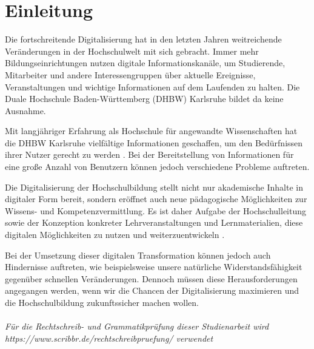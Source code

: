 \chapter{Einleitung}
Die fortschreitende Digitalisierung hat in den letzten Jahren weitreichende Veränderungen in der Hochschulwelt mit sich gebracht. Immer mehr Bildungseinrichtungen nutzen digitale Informationskanäle, um Studierende, Mitarbeiter und andere Interessengruppen über aktuelle Ereignisse, Veranstaltungen und wichtige Informationen auf dem Laufenden zu halten\cite{aachenerzeitung2022}. Die Duale Hochschule Baden-Württemberg (DHBW) Karlsruhe bildet da keine Ausnahme.

Mit langjähriger Erfahrung als Hochschule für angewandte Wissenschaften hat die DHBW Karlsruhe vielfältige Informationen geschaffen, um den Bedürfnissen ihrer Nutzer gerecht zu werden \cite{degruyter2021}. Bei der Bereitstellung von Informationen für eine große Anzahl von Benutzern können jedoch verschiedene Probleme auftreten.

Die Digitalisierung der Hochschulbildung stellt nicht nur akademische Inhalte in digitaler Form bereit, sondern eröffnet auch neue pädagogische Möglichkeiten zur Wissens- und Kompetenzvermittlung. \cite{hochschulforumdigitalisierung} Es ist daher Aufgabe der Hochschulleitung sowie der Konzeption konkreter Lehrveranstaltungen und Lernmaterialien, diese digitalen Möglichkeiten zu nutzen und weiterzuentwickeln \cite{springerlink2023}. 

Bei der Umsetzung dieser digitalen Transformation können jedoch auch Hindernisse auftreten, wie beispielsweise unsere natürliche Widerstandsfähigkeit gegenüber schnellen Veränderungen\cite{degruyter2021_2}. Dennoch müssen diese Herausforderungen angegangen werden, wenn wir die Chancen der Digitalisierung maximieren und die Hochschulbildung zukunftssicher machen wollen.
\\\\
\emph{Für die Rechtschreib- und Grammatikprüfung dieser Studienarbeit wird\\ https://www.scribbr.de/rechtschreibpruefung/ verwendet} 

